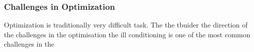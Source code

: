 \subsubsection{Challenges in Optimization}

Optimization is traditionally very difficult task. The the tbuider the direction of the challenges in the optimisation 
the ill conditioning is one of the most common challenges in the 